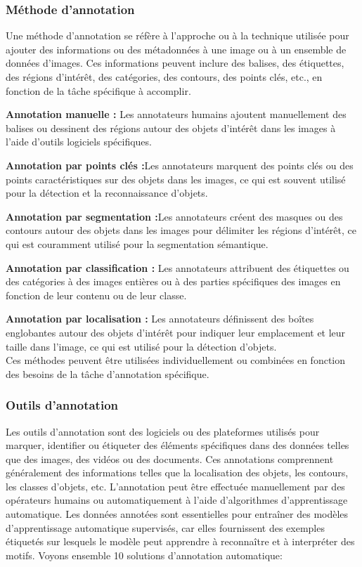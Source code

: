 \documentclass{article}
\begin{document}
	\subsubsection{Méthode d'annotation}
	\quad Une méthode d'annotation se réfère à l'approche ou à la technique utilisée pour ajouter des informations ou des métadonnées à une image ou à un ensemble de données d'images. Ces informations peuvent inclure des balises, des étiquettes, des régions d'intérêt, des catégories, des contours, des points clés, etc., en fonction de la tâche spécifique à accomplir.
	
	\textemdash \textbf{ Annotation manuelle : }Les annotateurs humains ajoutent manuellement des balises ou dessinent des régions autour des objets d'intérêt dans les images à l'aide d'outils logiciels spécifiques.
	
	\textemdash \textbf{ Annotation par points clés :}Les annotateurs marquent des points clés ou des points caractéristiques sur des objets dans les images, ce qui est souvent utilisé pour la détection et la reconnaissance d'objets.
	
	\textemdash \textbf{ Annotation par segmentation :}Les annotateurs créent des masques ou des contours autour des objets dans les images pour délimiter les régions d'intérêt, ce qui est couramment utilisé pour la segmentation sémantique.
	
	\textemdash \textbf{ Annotation par classification : }Les annotateurs attribuent des étiquettes ou des catégories à des images entières ou à des parties spécifiques des images en fonction de leur contenu ou de leur classe.
	
	\textemdash \textbf{ Annotation par localisation : }Les annotateurs définissent des boîtes englobantes autour des objets d'intérêt pour indiquer leur emplacement et leur taille dans l'image, ce qui est utilisé pour la détection d'objets. \\
	
	Ces méthodes peuvent être utilisées individuellement ou combinées en fonction des besoins de la tâche d'annotation spécifique.
	
	\subsubsection{Outils d'annotation}
	\quad Les outils d'annotation sont des logiciels ou des plateformes utilisés pour marquer, identifier ou étiqueter des éléments spécifiques dans des données telles que des images, des vidéos ou des documents. Ces annotations comprennent généralement des informations telles que la localisation des objets, les contours, les classes d'objets, etc. L'annotation peut être effectuée manuellement par des opérateurs humains ou automatiquement à l'aide d'algorithmes d'apprentissage automatique. Les données annotées sont essentielles pour entraîner des modèles d'apprentissage automatique supervisés, car elles fournissent des exemples étiquetés sur lesquels le modèle peut apprendre à reconnaître et à interpréter des motifs.
	Voyons ensemble	10 solutions d'annotation automatique:
	
\end{document}
